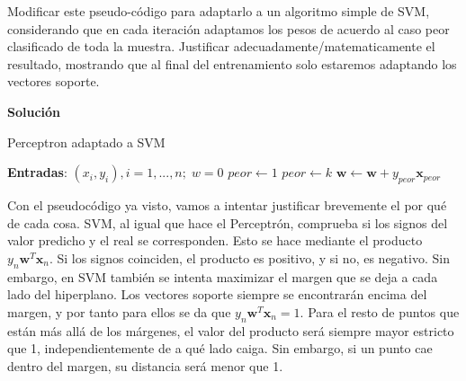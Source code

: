 \documentclass[11pt,a4paper]{article}
\newcommand{\answer}{\noindent\textbf{Solución}}
\begin{document}
\noindent Modificar este pseudo-código para adaptarlo a un algoritmo simple de SVM, considerando
que en cada iteración adaptamos los pesos de acuerdo al caso peor clasificado de toda la
muestra. Justificar adecuadamente/matematicamente el resultado, mostrando que al final
del entrenamiento solo estaremos adaptando los vectores soporte.

\answer

\begin{algorithm}[H]
\caption{Perceptron adaptado a SVM}
\begin{algorithmic}[1]
\State \textbf{Entradas}: $(x_i, y_i), i = 1, ..., n; \; w = 0$
\Repeat
	\State $peor \gets 1$
			\State $peor \gets k$
		\EndIf
	\EndFor
		\State $\mathbf{w} \gets \mathbf{w} + y_{peor} \mathbf{x}_{peor}$
	\EndIf
{}
\end{algorithmic}
\end{algorithm}

Con el pseudocódigo ya visto, vamos a intentar justificar brevemente el por qué de cada cosa. 
SVM, al igual que hace el Perceptrón, comprueba si los signos del valor predicho y el real se corresponden. Esto se hace mediante
el producto $y_n\mathbf{w}^T\mathbf{x}_n$. Si los signos coinciden, el producto es positivo, y si no, es negativo. Sin embargo,
en SVM también se intenta maximizar el margen que se deja a cada lado del hiperplano. Los vectores soporte siempre se encontrarán
encima del margen, y por tanto para ellos se da que $y_n\mathbf{w}^T\mathbf{x}_n = 1$. Para el resto de puntos que están más allá
de los márgenes, el valor del producto será siempre mayor estricto que 1, independientemente de a qué lado caiga. Sin embargo, si
un punto cae dentro del margen, su distancia será menor que 1. 
\end{document}
